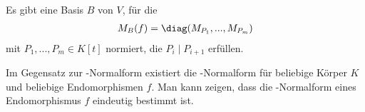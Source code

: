 \begin{conclusion}
	Es gibt eine Basis $B$ von $V$, für die 
	\begin{align}
		M_B(f)=\diag(M_{P_1},...,M_{P_m})\notag
	\end{align}
	mit $P_1,...,P_m\in K[t]$ normiert, die $P_i\mid P_{i+1}$ erfüllen.
\end{conclusion}

\begin{remark}
	Im Gegensatz zur -Normalform existiert die -Normalform für beliebige Körper $K$ und beliebige Endomorphismen $f$. Man kann zeigen, dass die -Normalform eines Endomorphismus $f$ eindeutig bestimmt ist.
\end{remark}
